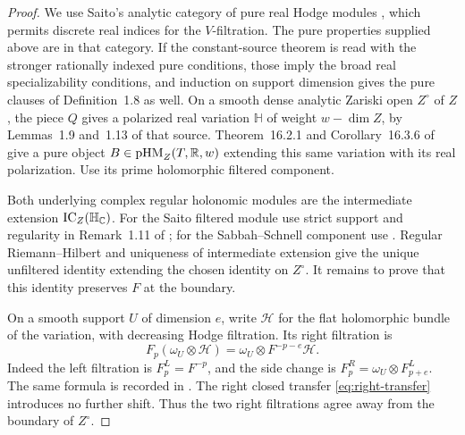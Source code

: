 \begin{proof}
We use Saito's analytic category of pure real Hodge modules
\cite[Sections~1.4 and~1.8]{Saito1990Kahler}, which permits discrete real
indices for the \(V\)-filtration.  The pure properties supplied above
are in that category.  If the constant-source theorem is read with the
stronger rationally indexed pure conditions, those imply the broad real
specializability conditions, and induction on support dimension gives
the pure clauses of Definition~1.8 as well.
On a smooth dense analytic Zariski open \(Z^\circ\) of \(Z\), the piece
\(Q\) gives a polarized real variation \(\mathbb H\) of weight
\(w-\dim Z\), by Lemmas~1.9 and~1.13 of that source.
Theorem~16.2.1 and Corollary~16.3.6 of
\cite{SabbahSchnell2026} give a pure object
\(B\in\mathrm{pHM}_Z(T,\mathbb R,w)\) extending this same variation with its
real polarization.  Use its prime holomorphic filtered component.

Both underlying complex regular holonomic modules are the intermediate
extension \(\operatorname{IC}_Z(\mathbb H_\mathbb C)\).  For the Saito filtered
module use strict support and regularity in Remark~1.11 of
\cite{Saito1990Kahler}; for the Sabbah--Schnell component use
\cite[Section~14.2.13 and Theorem~14.7.1]{SabbahSchnell2026}.
Regular Riemann--Hilbert and uniqueness of intermediate extension
\cite[Theorem~13.2.11 and Section~13.2.12]{SabbahSchnell2026}
give the unique unfiltered identity extending the chosen identity on
\(Z^\circ\).  It remains to prove that this identity preserves \(F\)
at the boundary.

On a smooth support \(U\) of dimension \(e\), write \(\mathscr H\) for
the flat holomorphic bundle of the variation, with decreasing Hodge
filtration.  Its right filtration is
\begin{equation}\label{eq:right-generic-filtration}
 F_p(\omega_U\otimes\mathscr H)=\omega_U\otimes F^{-p-e}\mathscr H.
\end{equation}
Indeed the left filtration is \(F_p^L=F^{-p}\), and the side change is
\(F_p^R=\omega_U\otimes F_{p+e}^L\).  The same formula is recorded in
\cite[Section~16.3.12]{SabbahSchnell2026}.  The right closed transfer
\eqref{eq:right-transfer} introduces no further shift.  Thus the two
right filtrations agree away from the boundary of \(Z^\circ\).


\end{proof}
